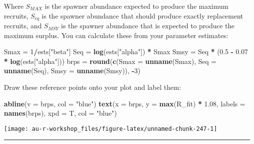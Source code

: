 \documentclass[]{book}
\newenvironment{Shaded}{\begin{snugshade}}{\end{snugshade}}
\newcommand{\KeywordTok}[1]{\textcolor[rgb]{0.13,0.29,0.53}{\textbf{#1}}}
\newcommand{\DataTypeTok}[1]{\textcolor[rgb]{0.13,0.29,0.53}{#1}}
\newcommand{\DecValTok}[1]{\textcolor[rgb]{0.00,0.00,0.81}{#1}}
\newcommand{\FloatTok}[1]{\textcolor[rgb]{0.00,0.00,0.81}{#1}}
\newcommand{\StringTok}[1]{\textcolor[rgb]{0.31,0.60,0.02}{#1}}
\newcommand{\OperatorTok}[1]{\textcolor[rgb]{0.81,0.36,0.00}{\textbf{#1}}}
\newcommand{\NormalTok}[1]{#1}
\theoremstyle{definition}
\theoremstyle{definition}
\theoremstyle{definition}
\theoremstyle{remark}
\begin{document}
Where \(S_{MAX}\) is the spawner abundance expected to produce the
maximum recruits, \(S_{eq}\) is the spawner abundance that should
produce exactly replacement recruits, and \(S_{MSY}\) is the spawner
abundance that is expected to produce the maximum surplus. You can
calculate these from your parameter estimates:

\begin{Shaded}
\begin{Highlighting}[]
\NormalTok{Smax =}\StringTok{ }\DecValTok{1}\OperatorTok{/}\NormalTok{ests[}\StringTok{"beta"}\NormalTok{]}
\NormalTok{Seq =}\StringTok{ }\KeywordTok{log}\NormalTok{(ests[}\StringTok{"alpha"}\NormalTok{]) }\OperatorTok{*}\StringTok{ }\NormalTok{Smax}
\NormalTok{Smsy =}\StringTok{ }\NormalTok{Seq }\OperatorTok{*}\StringTok{ }\NormalTok{(}\FloatTok{0.5} \OperatorTok{-}\StringTok{ }\FloatTok{0.07} \OperatorTok{*}\StringTok{ }\KeywordTok{log}\NormalTok{(ests[}\StringTok{"alpha"}\NormalTok{]))}
\NormalTok{brps =}\StringTok{ }\KeywordTok{round}\NormalTok{(}\KeywordTok{c}\NormalTok{(}\DataTypeTok{Smax =} \KeywordTok{unname}\NormalTok{(Smax),}
               \DataTypeTok{Seq =} \KeywordTok{unname}\NormalTok{(Seq),}
               \DataTypeTok{Smsy =} \KeywordTok{unname}\NormalTok{(Smsy)), }\OperatorTok{-}\DecValTok{3}\NormalTok{)}
\end{Highlighting}
\end{Shaded}

Draw these reference points onto your plot and label them:

\begin{Shaded}
\begin{Highlighting}[]
\KeywordTok{abline}\NormalTok{(}\DataTypeTok{v =}\NormalTok{ brps, }\DataTypeTok{col =} \StringTok{"blue"}\NormalTok{)}
\KeywordTok{text}\NormalTok{(}\DataTypeTok{x =}\NormalTok{ brps, }\DataTypeTok{y =} \KeywordTok{max}\NormalTok{(R_fit) }\OperatorTok{*}\StringTok{ }\FloatTok{1.08}\NormalTok{, }
     \DataTypeTok{labels =} \KeywordTok{names}\NormalTok{(brps), }\DataTypeTok{xpd =}\NormalTok{ T, }\DataTypeTok{col =} \StringTok{"blue"}\NormalTok{)}
\end{Highlighting}
\end{Shaded}

\begin{center}\texttt{[image: au-r-workshop\_files/figure-latex/unnamed-chunk-247-1]} \end{center}

\begin{center}\rule{0.5\linewidth}{\linethickness}\end{center}
\end{document}
